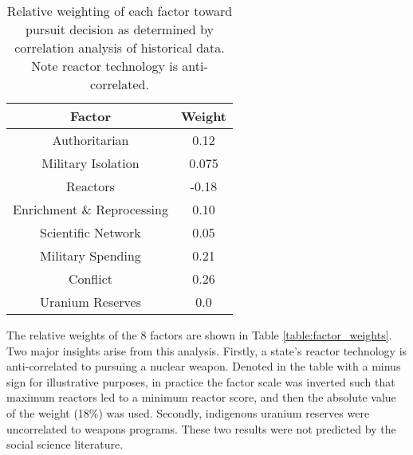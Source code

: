 \begin{table}
\centering
\begin{tabular}{|c|c|}
\hline
\textbf{Factor}        & \textbf{Weight} \\
\hline
Authoritarian   & 0.12 \\
Military Isolation & 0.075 \\
Reactors           & -0.18 \\
Enrichment \& Reprocessing & 0.10 \\
Scientific Network & 0.05 \\
Military Spending & 0.21 \\
Conflict  & 0.26 \\
Uranium Reserves &  0.0 \\
\hline
\end{tabular}
\caption{Relative weighting of each factor toward pursuit decision as determined by correlation analysis of historical data. Note reactor technology is anti-correlated.}
\label{tab:factor_weights}
\end{table}

The relative weights of the 8 factors are shown in Table \ref{table:factor_weights}.  Two major insights arise from this analysis. Firstly, a state's reactor technology is anti-correlated to pursuing a nuclear weapon.  Denoted in the table with a minus sign for illustrative purposes, in practice the factor scale was inverted such that maximum reactors led to a minimum reactor score, and then the absolute value of the weight (18\%) was used.  Secondly, indigenous uranium reserves were uncorrelated to weapons programs. These two results were not predicted by the social science literature.


